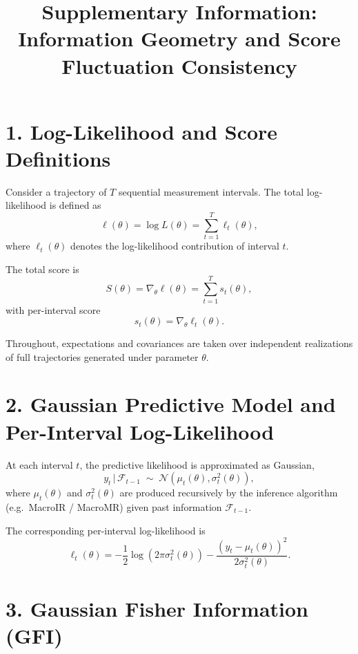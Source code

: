 \documentclass[11pt]{article}
\title{Supplementary Information: Information Geometry and Score Fluctuation Consistency}
\author{}
\date{}
\begin{document}
\maketitle

\section*{1. Log-Likelihood and Score Definitions}

Consider a trajectory of $T$ sequential measurement intervals.
The total log-likelihood is defined as
\begin{equation}
\ell(\theta) 
= \log L(\theta)
= \sum_{t=1}^T \ell_t(\theta),
\end{equation}
where $\ell_t(\theta)$ denotes the log-likelihood contribution of interval $t$.

The total score is
\begin{equation}
S(\theta) = \nabla_\theta \ell(\theta)
= \sum_{t=1}^T s_t(\theta),
\end{equation}
with per-interval score
\begin{equation}
s_t(\theta) = \nabla_\theta \ell_t(\theta).
\end{equation}

Throughout, expectations and covariances are taken over independent realizations of full trajectories
generated under parameter $\theta$.

\section*{2. Gaussian Predictive Model and Per-Interval Log-Likelihood}

At each interval $t$, the predictive likelihood is approximated as Gaussian,
\begin{equation}
y_t \,\big|\, \mathcal{F}_{t-1} \;\sim\; \mathcal{N}\!\left(\mu_t(\theta), \sigma_t^2(\theta)\right),
\end{equation}
where $\mu_t(\theta)$ and $\sigma_t^2(\theta)$ are produced recursively by the inference algorithm
(e.g.\ MacroIR / MacroMR) given past information $\mathcal{F}_{t-1}$.

The corresponding per-interval log-likelihood is
\begin{equation}
\ell_t(\theta)
=
-\frac{1}{2}\log\!\left(2\pi\sigma_t^2(\theta)\right)
-\frac{\left(y_t-\mu_t(\theta)\right)^2}{2\sigma_t^2(\theta)}.
\end{equation}

\section*{3. Gaussian Fisher Information (GFI)}
\end{document}
